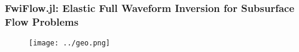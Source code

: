 \documentclass[usenames,dvipsnames]{beamer}
\begin{document}
%	
%
%
%


\begin{frame}
	\frametitle{FwiFlow.jl: Elastic Full Waveform Inversion for Subsurface Flow Problems}
	\begin{figure}[hbt]
  \texttt{[image: ../geo.png]}
\end{figure}
\end{frame}
\end{document}
